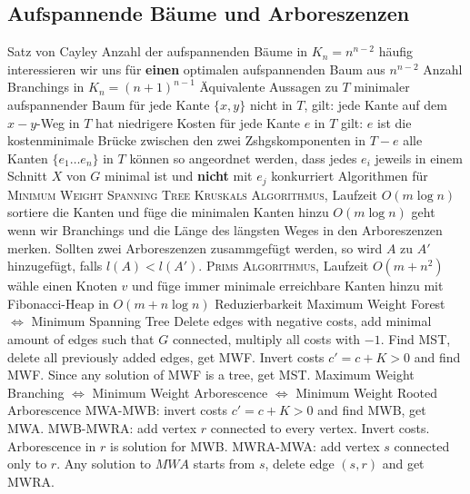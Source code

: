 \subsection{Aufspannende Bäume und Arboreszenzen}
\begin{outline}
    \1 Satz von Cayley 
        \2 Anzahl der aufspannenden Bäume in $K_n = n^{n-2}$
        \2 häufig interessieren wir uns für \textbf{einen} optimalen aufspannenden Baum aus $n^{n-2}$
        \2 Anzahl Branchings in $K_n = (n+1)^{n-1}$
    \1 Äquivalente Aussagen zu $T$ minimaler aufspannender Baum
        \2 für jede Kante $\{x,y\}$ nicht in $T$, gilt: jede Kante auf dem $x-y$-Weg in $T$ hat niedrigere Kosten
        \2 für jede Kante $e$ in $T$ gilt: $e$ ist die kostenminimale Brücke zwischen den zwei Zshgskomponenten in $T-e$  
        \2 alle Kanten $\{e_1\ldots e_n\}$ in $T$ können so angeordnet werden, dass jedes $e_i$ jeweils in einem Schnitt $X$ von $G$ minimal ist und \textbf{nicht} mit $e_j$ konkurriert
    \1 Algorithmen für \textsc{Minimum Weight Spanning Tree}
        \2 \textsc{Kruskals Algorithmus}, Laufzeit $O(m\log n)$
            \3 sortiere die Kanten und füge die minimalen Kanten hinzu
            \3 $O(m \log n)$ geht wenn wir Branchings und die Länge des längsten Weges in den Arboreszenzen merken. Sollten zwei Arboreszenzen zusammgefügt werden, so wird $A$ zu $A'$ hinzugefügt, falls $l(A) < l(A')$.
        \2 \textsc{Prims Algorithmus}, Laufzeit $O(m+n^2)$
            \3 wähle einen Knoten $v$ und füge immer minimale erreichbare Kanten hinzu 
            \3 mit Fibonacci-Heap in $O(m+n \log n)$
    \1 Reduzierbarkeit
        \2 Maximum Weight Forest $\iff$ Minimum Spanning Tree
            \3 Delete edges with negative costs, add minimal amount of edges such that $G$ connected, multiply all costs with $-1$. Find MST, delete all previously added edges, get MWF.
            \3 Invert costs $c'=c+K>0$ and find MWF. Since any solution of MWF is a tree, get MST.
        \2 Maximum Weight Branching $\iff$ Minimum Weight Arborescence $\iff$ Minimum Weight Rooted Arborescence
            \3 MWA-MWB: invert costs $c'=c+K>0$ and find MWB, get MWA.
            \3 MWB-MWRA: add vertex $r$ connected to every vertex. Invert costs. Arborescence in $r$ is solution for MWB.
            \3 MWRA-MWA: add vertex $s$ connected only to $r$. Any solution to $MWA$ starts from $s$, delete edge $(s,r)$ and get MWRA.
\end{outline}
